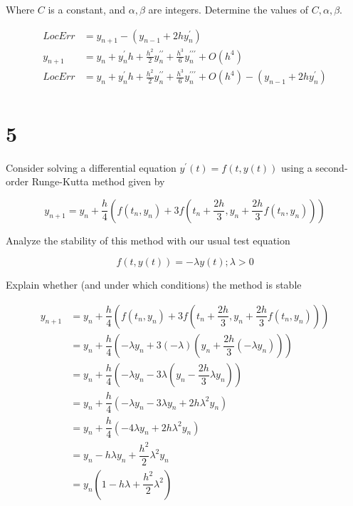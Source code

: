 \documentclass[11pt]{article}
\begin{document}
Where $C$ is a constant, and $\alpha, \beta$ are integers. Determine the values of $C, \alpha, \beta$.

\begin{align*}
  LocErr &= y_{n+1} - (y_{n-1} + 2h y^\prime_n) \\
  y_{n+1} &= y_{n} + y^\prime_{n} h + \frac{h^2}{2} y^{\prime\prime}_{n} + \frac{h^3}{6} y^{\prime\prime\prime}_{n} + O(h^4) \\
  LocErr &= y_{n} + y^\prime_{n} h + \frac{h^2}{2} y^{\prime\prime}_{n} + \frac{h^3}{6} y^{\prime\prime\prime}_{n} + O(h^4) - (y_{n-1} + 2hy^{\prime}_n) \\
\end{align*}

\section{5}

Consider solving a differential equation $y^\prime(t) = f(t, y(t))$ using a second-order Runge-Kutta method given by

\[ y_{n+1} = y_n + \dfrac{h}{4} \left( f(t_n, y_n) + 3f \left( t_n + \dfrac{2h}{3}, y_n + \dfrac{2h}{3} f(t_n, y_n) \right) \right) \]

Analyze the stability of this method with our usual test equation

\[ f(t, y(t)) = - \lambda y(t); \lambda > 0 \]

Explain whether (and under which conditions) the method is stable

\begin{align*}
  y_{n+1} &= y_n + \dfrac{h}{4} \left( f(t_n, y_n) + 3f \left( t_n + \dfrac{2h}{3}, y_n + \dfrac{2h}{3} f(t_n, y_n) \right) \right) \\
  &= y_n + \dfrac{h}{4} \left( -\lambda y_n + 3 (-\lambda) \left( y_n + \dfrac{2h}{3} (-\lambda y_n) \right) \right) \\
  &= y_n + \dfrac{h}{4} \left( -\lambda y_n - 3 \lambda \left( y_n - \dfrac{2h}{3} \lambda y_n  \right) \right) \\
  &= y_n + \dfrac{h}{4} \left( -\lambda y_n - 3 \lambda y_n + 2h \lambda^2 y_n \right) \\
  &= y_n + \dfrac{h}{4} \left( - 4 \lambda y_n + 2h \lambda^2 y_n \right) \\
  &= y_n - h \lambda y_n + \dfrac{h^2}{2} \lambda^2 y_n \\
  &= y_n (1 - h \lambda + \dfrac{h^2}{2} \lambda^2) \\
\end{align*}
\end{document}
